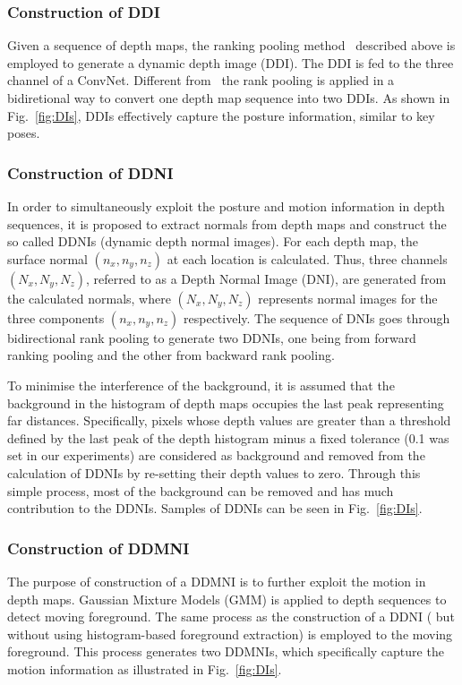 \documentclass[10pt, a4paper, conference]{IEEEtran}
\begin{document}
\subsubsection{Construction of DDI}
Given a sequence of depth maps, the ranking pooling method~\cite{bilen2016dynamic} described above is employed to generate a dynamic depth image (DDI).  The DDI is fed to the three channel of a ConvNet. Different from~\cite{bilen2016dynamic} the rank pooling is applied in a bidiretional way to convert one depth map sequence into two DDIs. As shown in Fig.~\ref{fig:DIs}, DDIs effectively capture the posture information, similar to key poses.

\subsubsection{Construction of DDNI}

In order to simultaneously exploit the posture and motion information in depth sequences, it is proposed to extract normals from depth maps and construct the so called DDNIs (dynamic depth normal images). For each depth map, the surface normal $(n_x,n_y,n_z)$ at each location is calculated. Thus, three channels $(N_x,N_y,N_z)$, referred to as a Depth Normal Image (DNI), are generated from the calculated normals, where $(N_x,N_y,N_z)$ represents normal images for the three components $(n_x,n_y,n_z)$ respectively. The sequence of DNIs goes through bidirectional rank pooling to generate two DDNIs, one  being from forward ranking pooling and the other from backward rank pooling.

To minimise the interference of the background, it is assumed that the background in the histogram of depth maps occupies the last peak representing far distances. Specifically, pixels whose depth values are greater than a threshold defined by the last peak of the depth histogram minus a fixed tolerance (0.1 was set in our experiments) are considered as background and removed from the calculation of DDNIs by re-setting their depth values to zero. Through this simple process, most of the background can be removed and has much contribution to the DDNIs.  Samples of DDNIs can be seen in Fig.~\ref{fig:DIs}.

\subsubsection{Construction of DDMNI}

The purpose of construction of a DDMNI is to further exploit the motion in depth maps. Gaussian Mixture Models (GMM) is applied to depth sequences to detect moving foreground. The same process as the construction of a DDNI ( but without using histogram-based foreground extraction) is employed to the moving foreground. This process generates two DDMNIs, which specifically capture the motion information as illustrated in Fig.~\ref{fig:DIs}. 
\end{document}
